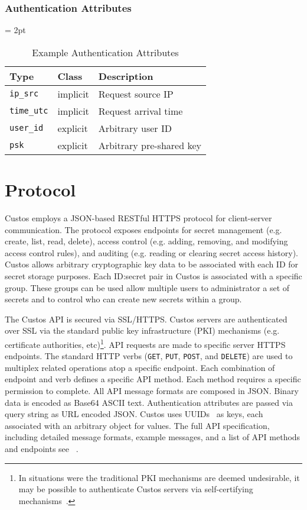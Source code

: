 \subsubsection{Authentication Attributes}
\label{chap:custos:arch:ac:aa}

\begin{table}[t]
  \centering
  \tabulinesep = 2pt
  \begin{tabu} to \textwidth
    { | X[1.5,l,m]
      | X[1,l,m]
      | X[3,l,m]
      | }
    \hline
    \textbf{Type}
    & \textbf{Class}
    & \textbf{Description}
    \\ \hline
    \texttt{ip\_src}
    & implicit
    & Request source IP
    \\ \hline
    \texttt{time\_utc}
    & implicit
    & Request arrival time
    \\ \hline
    \texttt{user\_id}
    & explicit
    & Arbitrary user ID
    \\ \hline
    \texttt{psk}
    & explicit
    & Arbitrary pre-shared key
    \\ \hline
  \end{tabu}
  \caption{Example Authentication Attributes}
  \label{tab:custos-attributes}
\end{table}

\section{Protocol}

Custos employs a JSON-based RESTful HTTPS protocol for client-server
communication. The protocol exposes endpoints for secret management
(e.g. create, list, read, delete), access control (e.g. adding,
removing, and modifying access control rules), and auditing
(e.g. reading or clearing secret access history). Custos allows
arbitrary cryptographic key data to be associated with each ID for
secret storage purposes. Each ID:secret pair in Custos is associated
with a specific group. These groups can be used allow multiple users
to administrator a set of secrets and to control who can create new
secrets within a group.

The Custos API is secured via SSL/HTTPS. Custos servers are
authenticated over SSL via the standard public key infrastructure
(PKI) mechanisms (e.g. certificate authorities, etc)\footnote{In
  situations were the traditional PKI mechanisms are deemed
  undesirable, it may be possible to authenticate Custos servers via
  self-certifying mechanisms~\cite{ellison1996, mazieres1999}.}. API
requests are made to specific server HTTPS endpoints. The standard
HTTP verbs (\texttt{GET}, \texttt{PUT}, \texttt{POST}, and
\texttt{DELETE}) are used to multiplex related operations atop a
specific endpoint. Each combination of endpoint and verb defines a
specific API method. Each method requires a specific permission to
complete. All API message formats are composed in JSON. Binary data is
encoded as Base64 ASCII text. Authentication attributes are passed via
query string as URL encoded JSON. Custos uses UUIDs~\cite{leach2005}
as keys, each associated with an arbitrary object for values.  The
full API specification, including detailed message formats, example
messages, and a list of API methods and endpoints see
~\cite{custos-masters}.

